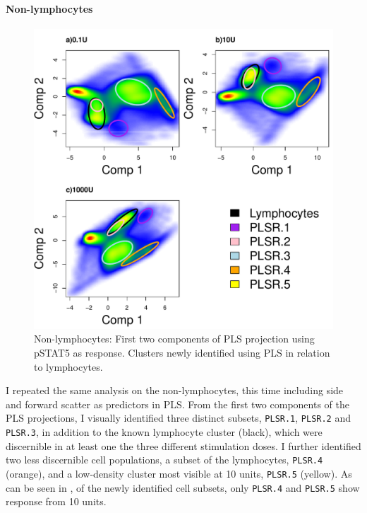 \paragraph{Non-lymphocytes} 

\begin{figure}[!h]
\centering
\includegraphics[scale=.7]{figures/plsr-nonlymphocytes}
{ Non-lymphocytes: First two components of \gls{PLS} projection using pSTAT5 as response.}
{
Clusters newly identified using \gls{PLS} in relation to lymphocytes.
} 
\end{figure}

I repeated the same analysis on the non-lymphocytes, this time including side and forward scatter as predictors in \gls{PLS}.
From the first two components of the \gls{PLS} projections, I visually identified three distinct subsets, \texttt{PLSR.1}, \texttt{PLSR.2}  and \texttt{PLSR.3}, in addition to the known lymphocyte cluster (black), which were discernible in at least one the three different stimulation doses.
I further identified two less discernible cell populations, a subset of the lymphocytes, \texttt{PLSR.4} (orange), and a low-density cluster most visible at 10 units, \texttt{PLSR.5} (yellow).
As can be seen in , of the newly identified cell subsets, only \texttt{PLSR.4} and \texttt{PLSR.5} show response from 10 units.

